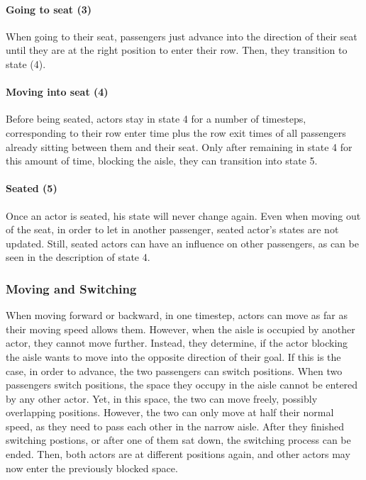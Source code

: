 \documentclass[11pt]{article}
\begin{document}
\paragraph{Going to seat (3)}
When going to their seat, passengers just advance into the direction of their seat until they are at the right position to enter their row. Then, they transition to state (4).


\paragraph{Moving into seat (4)}
Before being seated, actors stay in state 4 for a number of timesteps, corresponding to their row enter time plus the row exit times of all passengers already sitting between them and their seat. Only after remaining in state 4 for this amount of time, blocking the aisle, they can transition into state 5.

\paragraph{Seated (5)}
Once an actor is seated, his state will never change again. Even when moving out of the seat, in order to let in another passenger, seated actor's states are not updated. Still, seated actors can have an influence on other passengers, as can be seen in the description of state 4.


\subsubsection{Moving and Switching}
When moving forward or backward, in one timestep, actors can move as far as their moving speed allows them. However, when the aisle is occupied by another actor, they cannot move further. Instead, they determine, if the actor blocking the aisle wants to move into the opposite direction of their goal. If this is the case, in order to advance, the two passengers can switch positions. When two passengers switch positions, the space they occupy in the aisle cannot be entered by any other actor. Yet, in this space, the two can move freely, possibly overlapping positions. However, the two can only move at half their normal speed, as they need to pass each other in the narrow aisle. After they finished switching postions, or after one of them sat down, the switching process can be ended. Then, both actors are at different positions again, and other actors may now enter the previously blocked space.
\end{document}
